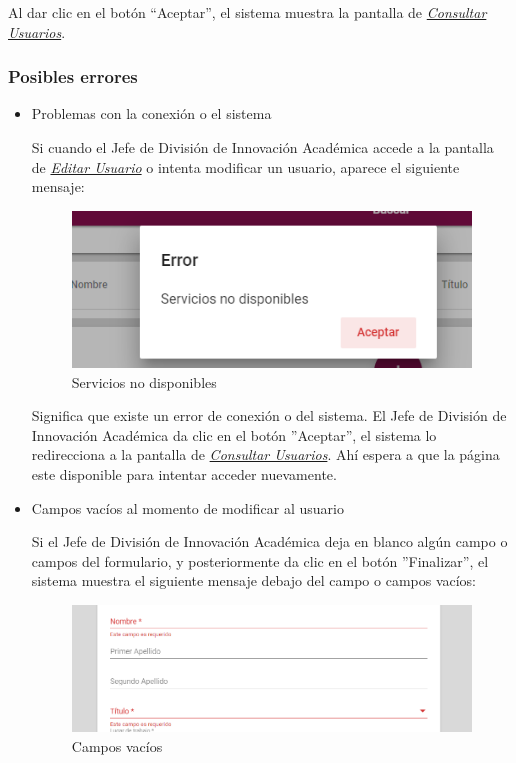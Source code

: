 Al dar clic en el botón “Aceptar”, el sistema muestra la pantalla de \hyperlink{consultarUs}{\textit{Consultar Usuarios}}.

\subsubsection{Posibles errores}
\begin{itemize}
	\item Problemas con la conexión o el sistema
	
	Si cuando el Jefe de División de Innovación Académica  accede a la pantalla de \hyperlink{editarUs}{\textit{Editar Usuario}} o intenta modificar un usuario, aparece el siguiente mensaje:
	\clearpage
	\begin{figure}[H]
		\centering
		\includegraphics[width=0.4\linewidth]{images/SP5/MSGSN}
		\caption{Servicios no disponibles}
		
	\end{figure}
	
	
	Significa que existe un error de conexión o del sistema. El Jefe de División de Innovación Académica  da clic en el botón ''Aceptar'', el sistema lo redirecciona  a la pantalla de \hyperlink{consultarUs}{\textit{Consultar Usuarios}}. Ahí  espera a que la página este disponible para intentar acceder nuevamente.
	
	\item Campos vacíos al momento de modificar al usuario
	
	Si el Jefe de División de Innovación Académica  deja en blanco algún campo o campos del formulario, y posteriormente da clic en el botón ''Finalizar'', el sistema muestra el siguiente mensaje debajo del campo o campos vacíos:
	
	\begin{figure}[H]
		\centering
		\includegraphics[width=0.4\linewidth]{images/SP5/MSG44}
		\caption{Campos vacíos}
		\label{mensaje44}
		
	\end{figure}
	

\end{itemize}
